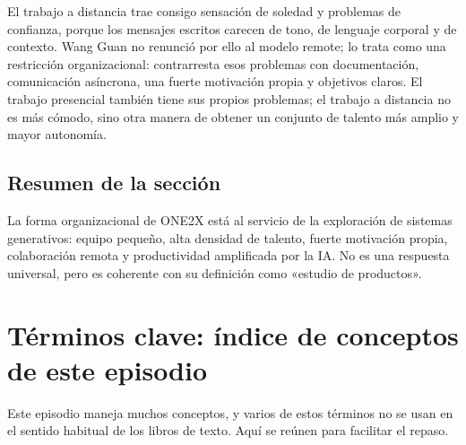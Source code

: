 \documentclass[a4paper]{article}
\begin{document}
El trabajo a distancia trae consigo sensación de soledad y problemas de confianza, porque los mensajes escritos carecen de tono, de lenguaje corporal y de contexto. Wang Guan no renunció por ello al modelo remote; lo trata como una restricción organizacional: contrarresta esos problemas con documentación, comunicación asíncrona, una fuerte motivación propia y objetivos claros. El trabajo presencial también tiene sus propios problemas; el trabajo a distancia no es más cómodo, sino otra manera de obtener un conjunto de talento más amplio y mayor autonomía.

\subsection{Resumen de la sección}

La forma organizacional de ONE2X está al servicio de la exploración de sistemas generativos: equipo pequeño, alta densidad de talento, fuerte motivación propia, colaboración remota y productividad amplificada por la IA. No es una respuesta universal, pero es coherente con su definición como «estudio de productos».
\section{Términos clave: índice de conceptos de este episodio}

Este episodio maneja muchos conceptos, y varios de estos términos no se usan en el sentido habitual de los libros de texto. Aquí se reúnen para facilitar el repaso.
\end{document}
